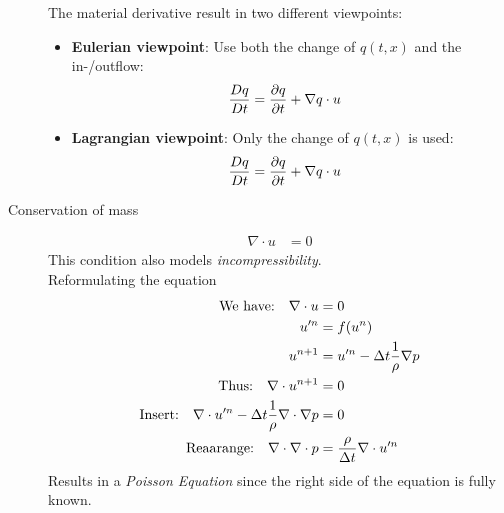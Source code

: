 \begin{multicols}{2}
\begin{description}
		The material derivative result in two different viewpoints:
			\begin{itemize}
				\item \textbf{Eulerian viewpoint}: Use both the change of $q(t,x)$ and the in-/outflow:
					\begin{align*}
						{Dq \over  Dt} &= {\partial q \over  \partial t} + {\nabla q \cdot u}
					\end{align*}
				\item \textbf{Lagrangian viewpoint}: Only the change of $q(t,x)$ is used:
					\begin{align*}
						{Dq \over  Dt} &= {\partial q \over  \partial t} + {\nabla q \cdot u}
					\end{align*}

			\end{itemize}
 

	\item[Conservation of mass] 
		\begin{align*}
			\nabla \cdot u &= 0
		\end{align*}
		This condition also models \emph{incompressibility}.\\
		
		Reformulating the equation
		\begin{align*}
			\text{We have:}\quad \nabla \cdot u &= 0\\
				u'^{n} &= f(u^n)\\
				u^{n+1} &= u'^n -\Delta t {1\over \rho} \nabla p\\
			\text{Thus:}\quad \nabla \cdot u^{n+1} &= 0\\
			\text{Insert:}\quad \nabla \cdot u'^n -\Delta t {1\over \rho} \nabla \cdot \nabla p &= 0\\
			\text{Reaarange:}\quad \nabla \cdot \nabla \cdot p &= {\rho \over \Delta t} \nabla \cdot u'^n
		\end{align*}
		Results in a \emph{Poisson Equation} since the right side of the equation is fully known.
		
\end{description}


\end{multicols}
